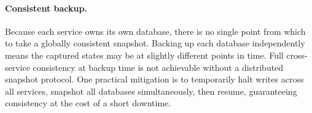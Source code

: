 \paragraph{Consistent backup.}
Because each service owns its own database, there is no single point from which to take a globally consistent snapshot. Backing up each database independently means the captured states may be at slightly different points in time. Full cross-service consistency at backup time is not achievable without a distributed snapshot protocol. One practical mitigation is to temporarily halt writes across all services, snapshot all databases simultaneously, then resume, guaranteeing consistency at the cost of a short downtime.
